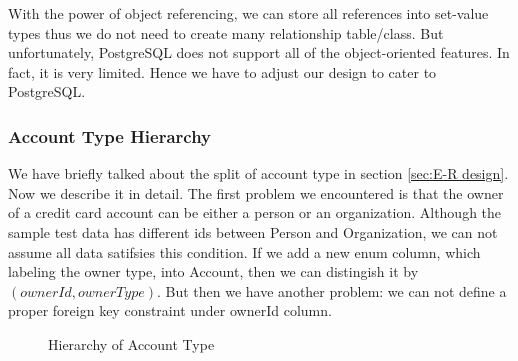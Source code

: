 \documentclass[11pt]{article}
\begin{document}
\par
With the power of object referencing, we can store all references into set-value types thus we do not need to create many relationship table/class. But unfortunately, PostgreSQL does not support all of the object-oriented features. In fact, it is very limited. Hence we have to adjust our design to cater to PostgreSQL.


\subsubsection{Account Type Hierarchy}

\par
We have briefly talked about the split of account type in section \ref{sec:E-R design}. Now we describe it in detail. The first problem we encountered is that the owner of a credit card account can be either a person or an organization. Although the sample test data has different ids between Person and Organization, we can not assume all data satifsies this condition. If we add a new enum column, which labeling the owner type, into Account, then we can distingish it by $(ownerId, ownerType)$. But then we have another problem: we can not define a proper foreign key constraint under ownerId column.

\begin{figure}
\caption{Hierarchy of Account Type}
\label{fig:accounthierarchy}
\end{figure}
\end{document}
